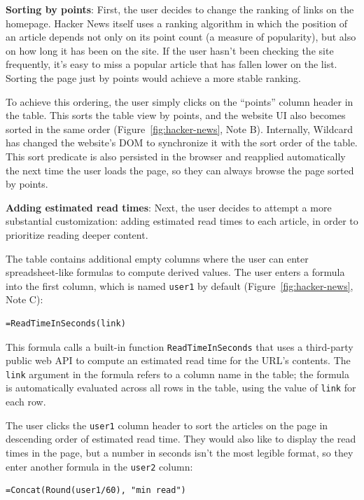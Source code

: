 \documentclass[sigplan,screen,10pt,anonymous,review]{acmart}
\begin{document}
\textbf{Sorting by points}: First, the user decides to change the
ranking of links on the homepage. Hacker News itself uses a ranking
algorithm in which the position of an article depends not only on its
point count (a measure of popularity), but also on how long it has been
on the site. If the user hasn't been checking the site frequently, it's
easy to miss a popular article that has fallen lower on the list.
Sorting the page just by points would achieve a more stable ranking.

To achieve this ordering, the user simply clicks on the ``points''
column header in the table. This sorts the table view by points, and the
website UI also becomes sorted in the same order
(Figure~\ref{fig:hacker-news}, Note B). Internally, Wildcard has changed
the website's DOM to synchronize it with the sort order of the table.
This sort predicate is also persisted in the browser and reapplied
automatically the next time the user loads the page, so they can always
browse the page sorted by points.

\textbf{Adding estimated read times}: Next, the user decides to attempt
a more substantial customization: adding estimated read times to each
article, in order to prioritize reading deeper content.

The table contains additional empty columns where the user can enter
spreadsheet-like formulas to compute derived values. The user enters a
formula into the first column, which is named \texttt{user1} by default
(Figure~\ref{fig:hacker-news}, Note C):

\begin{verbatim}
=ReadTimeInSeconds(link)
\end{verbatim}

This formula calls a built-in function \texttt{ReadTimeInSeconds} that
uses a third-party public web API to compute an estimated read time for
the URL's contents. The \texttt{link} argument in the formula refers to
a column name in the table; the formula is automatically evaluated
across all rows in the table, using the value of \texttt{link} for each
row.

The user clicks the \texttt{user1} column header to sort the articles on
the page in descending order of estimated read time. They would also
like to display the read times in the page, but a number in seconds
isn't the most legible format, so they enter another formula in the
\texttt{user2} column:

\begin{verbatim}
=Concat(Round(user1/60), "min read")
\end{verbatim}
\end{document}
